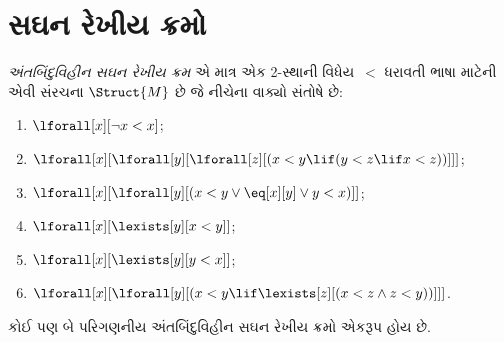 \begingroup
\makeatletter{}\makeatother

\section{સઘન રેખીય ક્રમો}
\label{guunit:OLP-0190}


\begin{defn}
  \emph{અંતબિંદુવિહીન સઘન રેખીય ક્રમ} એ માત્ર એક 2-સ્થાની
  વિધેય~$<$ ધરાવતી ભાષા માટેની એવી સંરચના
  $\Struct{M}$ છે જે નીચેના વાક્યો સંતોષે છે:
  \begin{enumerate}
  \item $\lforall[x][\lnot x < x]$;
  \item $\lforall[x][\lforall[y][\lforall[z][(x < y \lif (y < z \lif x
    <z ))]]]$;
  \item $\lforall[x][\lforall[y][(x< y \lor \eq[x][y] \lor y < x)]]$;
  \item $\lforall[x][\lexists[y][x < y]]$;
  \item $\lforall[x][\lexists[y][y < x]]$;
  \item $\lforall[x][\lforall[y][(x < y \lif \lexists[z][(x < z \land
        z < y))]]]$.
 \end{enumerate}
\end{defn}

\begin{thm}
  કોઈ પણ બે પરિગણનીય અંતબિંદુવિહીન સઘન રેખીય ક્રમો એકરૂપ હોય છે.
\end{thm}

